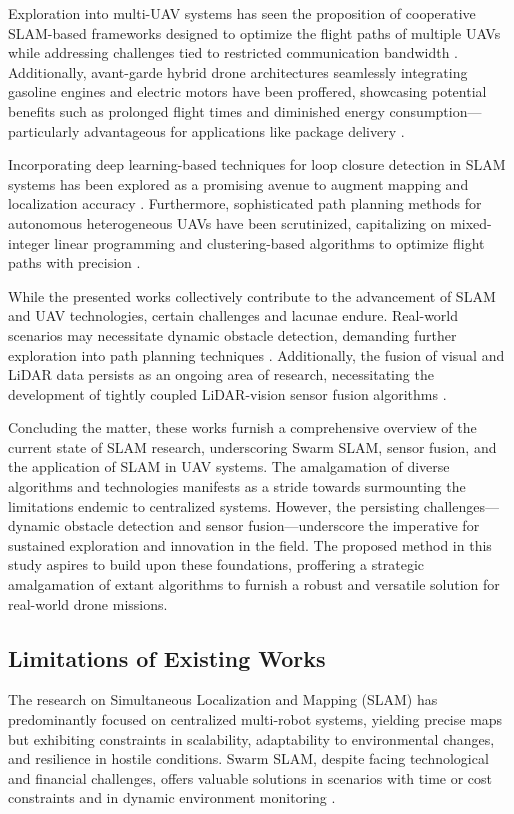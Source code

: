 \documentclass[preprint,12pt]{elsarticle}
\begin{document}
Exploration into multi-UAV systems has seen the proposition of cooperative SLAM-based frameworks designed to optimize the flight paths of multiple UAVs while addressing challenges tied to restricted communication bandwidth \cite{munguía2016vslam}. Additionally, avant-garde hybrid drone architectures seamlessly integrating gasoline engines and electric motors have been proffered, showcasing potential benefits such as prolonged flight times and diminished energy consumption—particularly advantageous for applications like package delivery \cite{stolaroff2018energy, jarrah2022flight}.

Incorporating deep learning-based techniques for loop closure detection in SLAM systems has been explored as a promising avenue to augment mapping and localization accuracy \cite{arshad2021loop}. Furthermore, sophisticated path planning methods for autonomous heterogeneous UAVs have been scrutinized, capitalizing on mixed-integer linear programming and clustering-based algorithms to optimize flight paths with precision \cite{chen2022coverage}.

While the presented works collectively contribute to the advancement of SLAM and UAV technologies, certain challenges and lacunae endure. Real-world scenarios may necessitate dynamic obstacle detection, demanding further exploration into path planning techniques \cite{yang2021rrt}. Additionally, the fusion of visual and LiDAR data persists as an ongoing area of research, necessitating the development of tightly coupled LiDAR-vision sensor fusion algorithms \cite{debeunne2020vlidar}.

Concluding the matter, these works furnish a comprehensive overview of the current state of SLAM research, underscoring Swarm SLAM, sensor fusion, and the application of SLAM in UAV systems. The amalgamation of diverse algorithms and technologies manifests as a stride towards surmounting the limitations endemic to centralized systems. However, the persisting challenges—dynamic obstacle detection and sensor fusion—underscore the imperative for sustained exploration and innovation in the field. The proposed method in this study aspires to build upon these foundations, proffering a strategic amalgamation of extant algorithms to furnish a robust and versatile solution for real-world drone missions.

\subsection{Limitations of Existing Works}
The research on Simultaneous Localization and Mapping (SLAM) has predominantly focused on centralized multi-robot systems, yielding precise maps but exhibiting constraints in scalability, adaptability to environmental changes, and resilience in hostile conditions. Swarm SLAM, despite facing technological and financial challenges, offers valuable solutions in scenarios with time or cost constraints and in dynamic environment monitoring \cite{li2018review}.
\end{document}
